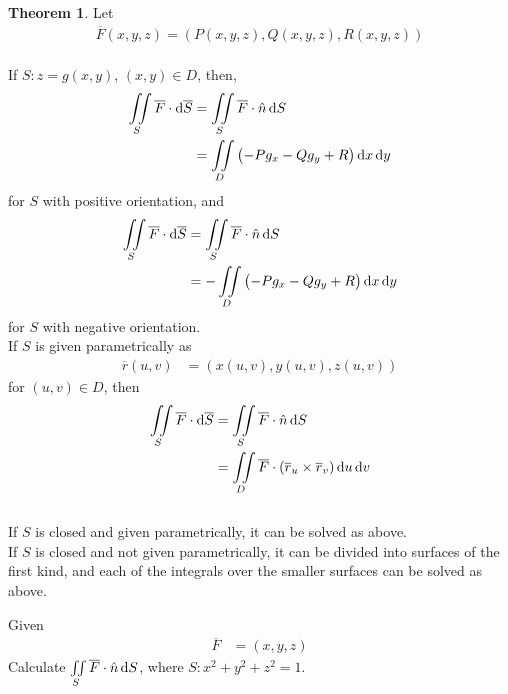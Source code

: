 \documentclass[fleqn, a4paper, 12pt, twoside]{article}
\theoremstyle{definition}
\theoremstyle{theorem}
\newtheorem{theorem}{Theorem}
\begin{document}
{\begin{theorem}
	Let
	\begin{align*}
		\overline{F}(x,y,z) = \left( P(x,y,z) , Q(x,y,z) , R(x,y,z) \right)
	\end{align*}
	~\\
	If $S : z = g(x,y)$, $(x,y) \in D$, then,
	\begin{align*}
		\iint\limits_{S} \overline{F} \cdot \dif \overline{S} & = \iint\limits_{S} \overline{F} \cdot \hat{n} \dif S \\
                                                                      & = \iint\limits_{D} \left( -P g_x - Q g_y + R \right) \dif x \dif y
	\end{align*}
	for $S$ with positive orientation, and
	\begin{align*}
		\iint\limits_{S} \overline{F} \cdot \dif \overline{S} & = \iint\limits_{S} \overline{F} \cdot \hat{n} \dif S \\
                                                                      & = -\iint\limits_{D} \left( -P g_x - Q g_y + R \right) \dif x \dif y
	\end{align*}
	for $S$ with negative orientation.
	~\\
	If $S$ is given parametrically as
	\begin{align*}
		\overline{r}(u,v) & = \left( x(u,v) , y(u,v) , z(u,v) \right)
	\end{align*}
	for $(u,v) \in D$, then
	\begin{align*}
		\iint\limits_{S} \overline{F} \cdot \dif \overline{S} & = \iint\limits_{S} \overline{F} \cdot \hat{n} \dif S \\
                                                                      & = \iint\limits_{D} \overline{F} \cdot \left( \overline{r}_u \times \overline{r}_v \right) \dif u \dif v
	\end{align*}
	~\\
	If $S$ is closed and given parametrically, it can be solved as above.\\
	If $S$ is closed and not given parametrically, it can be divided into surfaces of the first kind, and each of the integrals over the smaller surfaces can be solved as above.
\end{theorem}

\begin{question}
	Given
	\begin{align*}
		\overline{F} & = (x,y,z)
	\end{align*}
	Calculate $\iint\limits_{S} \overline{F} \cdot \hat{n} \dif S$, where $S : x^2 + y^2 + z^2 = 1$.
\end{question}

}
\end{document}
